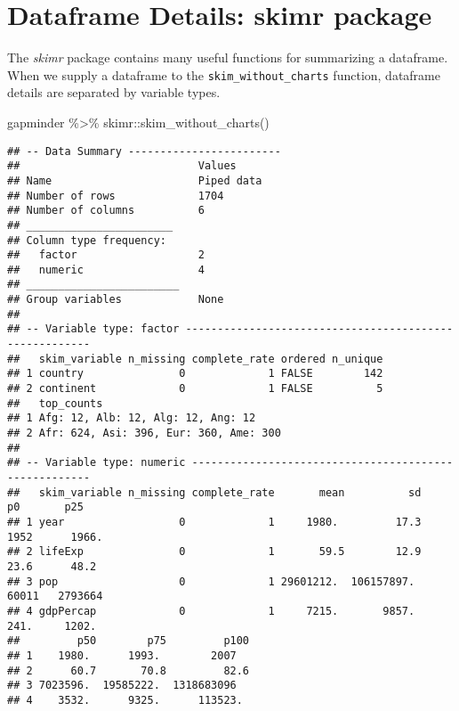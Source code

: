 \documentclass[
]{book}
\newenvironment{Shaded}{\begin{snugshade}}{\end{snugshade}}
\newcommand{\FunctionTok}[1]{\textcolor[rgb]{0.00,0.00,0.00}{#1}}
\newcommand{\NormalTok}[1]{#1}
\newcommand{\SpecialCharTok}[1]{\textcolor[rgb]{0.00,0.00,0.00}{#1}}
\begin{document}
\hypertarget{dataframe-details-skimr-package}{%
\section{Dataframe Details: skimr package}\label{dataframe-details-skimr-package}}

The \emph{skimr} package contains many useful functions for summarizing a dataframe. When we supply a dataframe to the \texttt{skim\_without\_charts} function, dataframe details are separated by variable types.

\begin{Shaded}
\begin{Highlighting}[]
\NormalTok{gapminder }\SpecialCharTok{\%\textgreater{}\%} 
\NormalTok{  skimr}\SpecialCharTok{::}\FunctionTok{skim\_without\_charts}\NormalTok{() }
\end{Highlighting}
\end{Shaded}

\begin{verbatim}
## -- Data Summary ------------------------
##                            Values    
## Name                       Piped data
## Number of rows             1704      
## Number of columns          6         
## _______________________              
## Column type frequency:               
##   factor                   2         
##   numeric                  4         
## ________________________             
## Group variables            None      
## 
## -- Variable type: factor -------------------------------------------------------
##   skim_variable n_missing complete_rate ordered n_unique
## 1 country               0             1 FALSE        142
## 2 continent             0             1 FALSE          5
##   top_counts                            
## 1 Afg: 12, Alb: 12, Alg: 12, Ang: 12    
## 2 Afr: 624, Asi: 396, Eur: 360, Ame: 300
## 
## -- Variable type: numeric ------------------------------------------------------
##   skim_variable n_missing complete_rate       mean          sd      p0       p25
## 1 year                  0             1     1980.         17.3  1952      1966. 
## 2 lifeExp               0             1       59.5        12.9    23.6      48.2
## 3 pop                   0             1 29601212.  106157897.  60011   2793664  
## 4 gdpPercap             0             1     7215.       9857.    241.     1202. 
##         p50        p75         p100
## 1    1980.      1993.        2007  
## 2      60.7       70.8         82.6
## 3 7023596.  19585222.  1318683096  
## 4    3532.      9325.      113523.
\end{verbatim}
\end{document}

